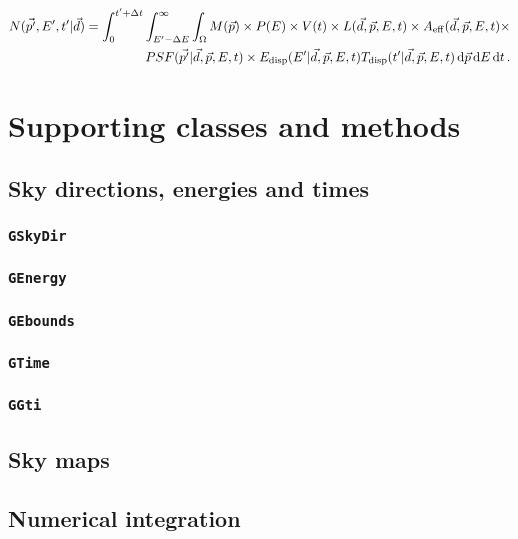 \documentclass{article}[12pt,a4]
\begin{document}
\begin{eqnarray}
N(\vec{p'}, E', t' | \vec{d}) = \int_{0}^{t'+\Delta t} \int_{E'-\Delta E}^{\infty} \int_{\Omega} 
M(\vec{p}) \times P(E) \times V(t) \times 
L(\vec{d}, \vec{p}, E, t) \times
A_{\rm eff}(\vec{d}, \vec{p}, E, t) \times \nonumber \\
PSF(\vec{p'} | \vec{d}, \vec{p}, E, t) \times
E_{\rm disp}(E' | \vec{d}, \vec{p}, E, t) 
T_{\rm disp}(t' | \vec{d}, \vec{p}, E, t) 
\, {\rm d}\vec{p} \, {\rm d}E \, {\rm d}t \, .
\end{eqnarray}




\section{Supporting classes and methods}

\subsection{Sky directions, energies and times}

\subsubsection{{\tt GSkyDir}}
\label{sec:GSkyDir}

\subsubsection{{\tt GEnergy}}
\label{sec:GEnergy}

\subsubsection{{\tt GEbounds}}
\label{sec:GEbounds}

\subsubsection{{\tt GTime}}
\label{sec:GTime}

\subsubsection{{\tt GGti}}
\label{sec:GGti}


\subsection{Sky maps}


\subsection{Numerical integration}
\label{sec:integration}
\end{document}
